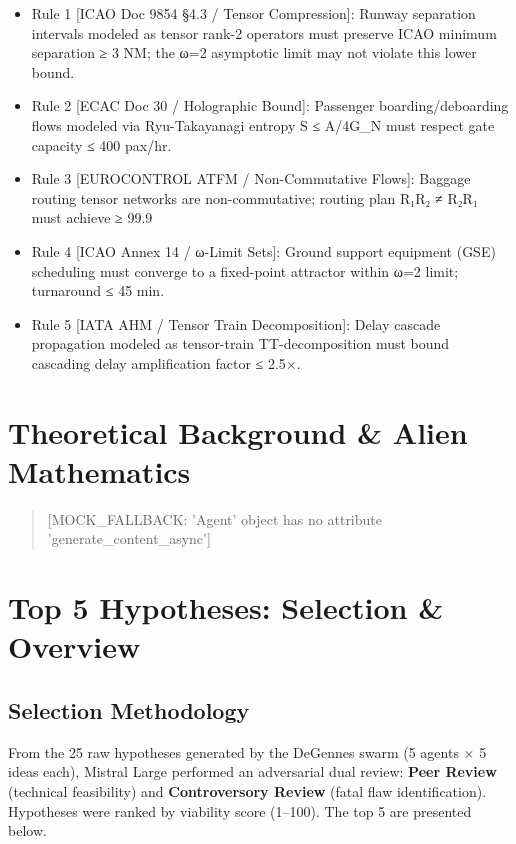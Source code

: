 \documentclass[11pt,a4paper]{report}
\begin{document}
\begin{tcolorbox}[colback=red!3!white,colframe=red!50!black,title=Socrate Formal Rules Engine]
\begin{itemize}[leftmargin=1.5em]
  \item Rule 1 [ICAO Doc 9854 §4.3 / Tensor Compression]: Runway separation intervals
  modeled as tensor rank-2 operators must preserve ICAO minimum separation ≥ 3 NM;
  the ω=2 asymptotic limit may not violate this lower bound.
  \item Rule 2 [ECAC Doc 30 / Holographic Bound]: Passenger boarding/deboarding flows
  modeled via Ryu-Takayanagi entropy S ≤ A/4G_N must respect gate capacity ≤ 400 pax/hr.
  \item Rule 3 [EUROCONTROL ATFM / Non-Commutative Flows]: Baggage routing tensor networks
  are non-commutative; routing plan R₁R₂ ≠ R₂R₁ must achieve ≥ 99.9%
  \item Rule 4 [ICAO Annex 14 / ω-Limit Sets]: Ground support equipment (GSE) scheduling
  must converge to a fixed-point attractor within ω=2 limit; turnaround ≤ 45 min.
  \item Rule 5 [IATA AHM / Tensor Train Decomposition]: Delay cascade propagation modeled
  as tensor-train TT-decomposition must bound cascading delay amplification factor ≤ 2.5×.
\end{itemize}
\end{tcolorbox}

\chapter{Theoretical Background \& Alien Mathematics}
\begin{quote}[MOCK_FALLBACK: 'Agent' object has no attribute 'generate_content_async']\end{quote}

\chapter{Top 5 Hypotheses: Selection \& Overview}
\section{Selection Methodology}
From the 25 raw hypotheses generated by the DeGennes swarm (5 agents × 5 ideas each),
Mistral Large performed an adversarial dual review:
\textbf{Peer Review} (technical feasibility) and \textbf{Controversory Review} (fatal flaw identification).
Hypotheses were ranked by viability score (1--100). The top 5 are presented below.
\end{document}
